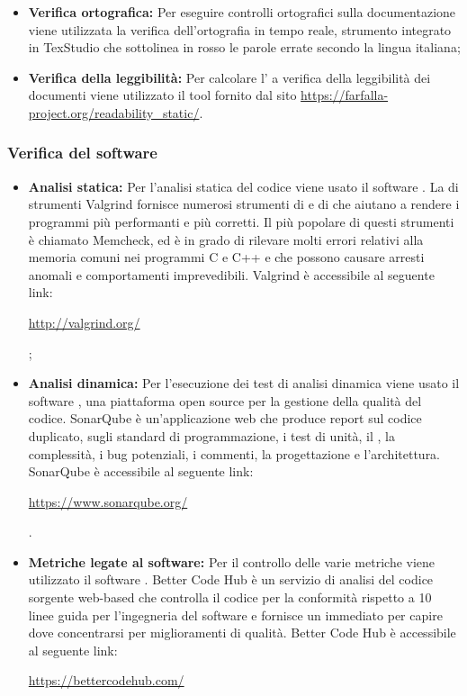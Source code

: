 \documentclass[../NormediProgetto.tex]{subfiles}
\begin{document}
\begin{itemize}
    \item \textbf{Verifica ortografica:} Per eseguire controlli ortografici sulla documentazione viene utilizzata la verifica dell’ortografia in tempo reale, strumento integrato in TexStudio che sottolinea in rosso le parole errate secondo la lingua italiana;
    
    \item \textbf{Verifica della leggibilità:} Per calcolare l' a verifica della leggibilità dei documenti viene utilizzato il tool fornito dal sito \url{https://farfalla-project.org/readability_static/}.
\end{itemize}

\subsubsection{Verifica del software}

\begin{itemize}
    \item \textbf{Analisi statica:} Per l’analisi statica del codice viene usato il software . La  di strumenti Valgrind fornisce numerosi strumenti di  e di  che aiutano a rendere i programmi più performanti e più corretti. Il più popolare di questi strumenti è chiamato Memcheck, ed è in grado di rilevare molti errori relativi alla memoria comuni nei programmi C e C++ e che possono causare arresti anomali e comportamenti imprevedibili. Valgrind è accessibile al seguente link: \\ \centerline{\url{http://valgrind.org/}};

    \item \textbf{Analisi dinamica:} Per l’esecuzione dei test di analisi dinamica viene usato il software , una piattaforma open source per la gestione della qualità del codice. SonarQube è un’applicazione web che produce report sul codice duplicato, sugli standard di programmazione, i test di unità, il , la complessità, i bug potenziali, i commenti, la progettazione e l’architettura. SonarQube è accessibile al seguente link: \\ \centerline{\url{https://www.sonarqube.org/}}.
    
    \item \textbf{Metriche legate al software:} Per il controllo delle varie metriche viene utilizzato il software . Better Code Hub è un servizio di analisi del codice sorgente web-based che controlla il codice per la conformità rispetto a 10 linee guida per l'ingegneria del software e fornisce un  immediato per capire dove concentrarsi per miglioramenti di qualità. Better Code Hub è accessibile al seguente link:\\ \centerline{\url{https://bettercodehub.com/}}
\end{itemize}
    
\end{document}
